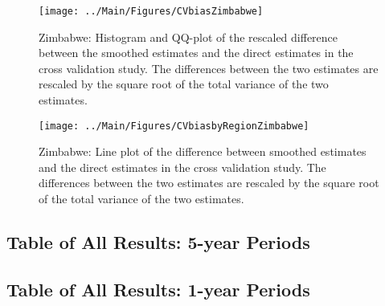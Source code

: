 \documentclass[12pt]{article}\usepackage[]{graphicx}\usepackage[]{color}
\newenvironment{knitrout}{}{} %
\begin{document}
\begin{knitrout}
\color{fgcolor}\begin{figure}[bht]

{\centering \texttt{[image: ../Main/Figures/CVbiasZimbabwe]} 

}

\caption[Zimbabwe]{Zimbabwe: Histogram and QQ-plot of the rescaled difference between the smoothed estimates and the direct estimates in the cross validation study. The differences between the two estimates are rescaled by the square root of the total variance of the two estimates.}\label{fig:unnamed-chunk-349}
\end{figure}


\end{knitrout}

\begin{knitrout}
\color{fgcolor}\begin{figure}[bht]

{\centering \texttt{[image: ../Main/Figures/CVbiasbyRegionZimbabwe]} 

}

\caption[Zimbabwe]{Zimbabwe: Line plot of the difference between smoothed estimates and the direct estimates in the cross validation study. The differences between the two estimates are rescaled by the square root of the total variance of the two estimates.}\label{fig:unnamed-chunk-350}
\end{figure}


\end{knitrout}


% 
\clearpage
\subsection{Table of All Results: 5-year Periods}
{\scriptsize

}

\clearpage
\subsection{Table of All Results: 1-year Periods}
{\scriptsize

}
\end{document}
